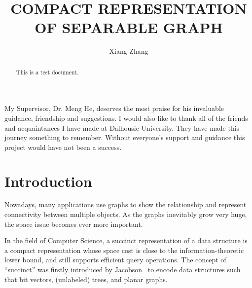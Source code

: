 \documentclass[12pt,glossary]{dalthesis}
\begin{document}
\macs  %
\title{COMPACT REPRESENTATION OF SEPARABLE GRAPH}
\author{Xiang Zhang}



\nolistoftables
\nolistoffigures

\frontmatter

\begin{abstract}
This is a test document.
\end{abstract}

\printglossary

\begin{acknowledgements}
My Supervisor, Dr. Meng He, deserves the most praise for his invaluable guidance, friendship and suggestions. I would also like to thank all of the friends and acquaintances I have made at Dalhousie University. They have made this journey something to remember. Without everyone’s support and guidance this project would have not been a success.
\end{acknowledgements}

\mainmatter

\chapter{Introduction}

Nowadays, many applications use graphs to show the relationship and represent connectivity between multiple objects. As the graphs inevitably grow very huge, the space issue becomes ever more important.

\bigskip

In the field of Computer Science, a succinct representation of a data structure is a compact representation whose space cost is close to the information-theoretic lower bound, and still supports efficient query operations. The concept of “succinct” was firstly introduced by Jacobson~\cite{Succinct} to encode data structures such that bit vectors, (unlabeled) trees, and planar graphs.
\bigskip
\end{document}
